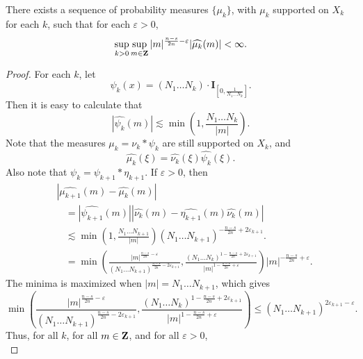 \begin{lemma}
    There exists a sequence of probability measures $\{ \mu_k \}$, with $\mu_k$ supported on $X_k$ for each $k$, such that for each $\varepsilon > 0$,
    \[ \sup_{k > 0} \sup_{m \in \operatorname{\mathbf{Z}}} |m|^{\frac{n-s}{2n} - \varepsilon} |\widehat{\mu_k}(m)| < \infty. \]
\end{lemma}
\begin{proof}
    For each $k$, let
    \[ \psi_k(x) = (N_1 \dots N_k) \cdot \mathbf{I}_{\left[ 0, \frac{1}{N_1 \dots N_k} \right]}. \]
    Then it is easy to calculate that
    \begin{equation} \label{equation901418294891481792}
        |\widehat{\psi_k}(m)| \lesssim \min \left( 1, \frac{N_1 \dots N_k}{|m|} \right).
    \end{equation}
    Note that the measures $\mu_k = \nu_k * \psi_k$ are still supported on $X_k$, and
    \[ \widehat{\mu_k}(\xi) = \widehat{\nu_k}(\xi) \widehat{\psi_k}(\xi). \]
    Also note that $\psi_k = \psi_{k+1} * \eta_{k+1}$. If $\varepsilon > 0$, then
    \begin{equation} \label{equation6892489214781278}
    \begin{split}
        &|\widehat{\mu_{k+1}}(m) - \widehat{\mu_k}(m)|\\
        &\ \ \ \ = |\widehat{\psi_{k+1}}(m)| |\widehat{\nu_k}(m) - \widehat{\eta_{k+1}}(m) \widehat{\nu_k}(m)|\\
        &\ \ \ \ \lesssim \min \left( 1, \frac{N_1 \dots N_{k+1}}{|m|} \right) (N_1 \dots N_{k+1})^{-\frac{n-s}{2n} + 2\varepsilon_{k+1}}.\\
        &\ \ \ \ = \min \left( \frac{|m|^{\frac{n-s}{2n} - \varepsilon}}{(N_1 \dots N_{k+1})^{\frac{n-s}{2n} - 2\varepsilon_{k+1}}}, \frac{(N_1 \dots N_k)^{1 - \frac{n-s}{2n} + 2\varepsilon_{k+1}}}{|m|^{1 - \frac{n-s}{2n} + \varepsilon}} \right) |m|^{- \frac{n-s}{2n} + \varepsilon}.
    \end{split}
    \end{equation}
    The minima is maximized when $|m| = N_1 \dots N_{k+1}$, which gives
    \[ \min \left( \frac{|m|^{\frac{n-s}{2n} - \varepsilon}}{(N_1 \dots N_{k+1})^{\frac{n-s}{2n} - 2\varepsilon_{k+1}}}, \frac{(N_1 \dots N_k)^{1 - \frac{n-s}{2n} + 2\varepsilon_{k+1}}}{|m|^{1 - \frac{n-s}{2n} + \varepsilon}} \right) \leq (N_1 \dots N_{k+1})^{2\varepsilon_{k+1} - \varepsilon}. \]
    Thus, for all $k$, for all $m \in \operatorname{\mathbf{Z}}$, and for all $\varepsilon > 0$,
    \begin{equation} \label{equation11020404120}

\end{equation}
\end{proof}

